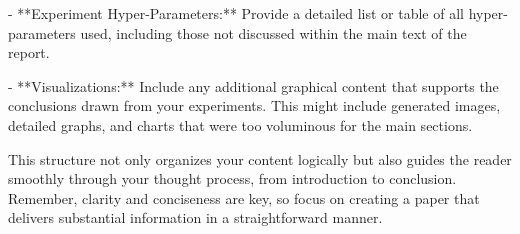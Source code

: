\documentclass{article}
\begin{document}
- **Experiment Hyper-Parameters:** Provide a detailed list or table of all hyper-parameters used, including those not discussed within the main text of the report.

- **Visualizations:** Include any additional graphical content that supports the conclusions drawn from your experiments. This might include generated images, detailed graphs, and charts that were too voluminous for the main sections.

This structure not only organizes your content logically but also guides the reader smoothly through your thought process, from introduction to conclusion. Remember, clarity and conciseness are key, so focus on creating a paper that delivers substantial information in a straightforward manner.
\end{document}
